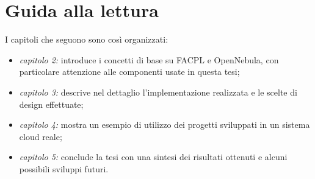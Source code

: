 \section{Guida alla lettura}
I capitoli che seguono sono così organizzati:
\begin{itemize}
    \item \emph{capitolo 2:} introduce i concetti di base su FACPL e OpenNebula, con particolare attenzione alle componenti usate in questa tesi;
    \item \emph{capitolo 3:} descrive nel dettaglio l'implementazione realizzata e le scelte di design effettuate;
    \item \emph{capitolo 4:} mostra un esempio di utilizzo dei progetti sviluppati in un sistema cloud reale;
    \item \emph{capitolo 5:} conclude la tesi con una sintesi dei risultati ottenuti e alcuni possibili sviluppi futuri.
\end{itemize}